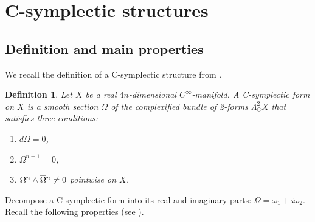 \documentclass[10pt]{amsart}
\newcommand{\calo}{\mathcal{O}}
\newcommand{\arrow}{{\:\longrightarrow\:}}
\newcommand{\goth}{\mathfrak}
\newcommand{\bbC}{\mathbb{C}}
\newcommand{\ii}{i}
\newtheorem{defn}{Definition}[section]
\newtheorem{prop}[defn]{Proposition}
\begin{document}


\section{C-symplectic structures}

\subsection{Definition and main properties}

We recall the definition of a C-symplectic structure from \cite{BDV}.

\begin{defn}\label{def_C_sympl}
Let $X$ be a real $4n$-dimensional $C^\infty$-manifold.
A C-symplectic form on $X$ is a smooth section
$\Omega$ of the complexified bundle of 2-forms $\Lambda^2_\bbC X$
that satisfies three conditions:
\begin{enumerate}
\item $d\Omega = 0$,
\item $\Omega^{n+1} = 0$,
\item $\Omega^n\wedge\overline{\Omega}\mathstrut^n \neq 0$ pointwise on $X$.
\end{enumerate}
\end{defn}

Decompose a C-symplectic form into its real and imaginary parts:
$\Omega = \omega_1 +\ii\omega_2$. Recall the following properties
(see \cite{BDV}).
\end{document}
